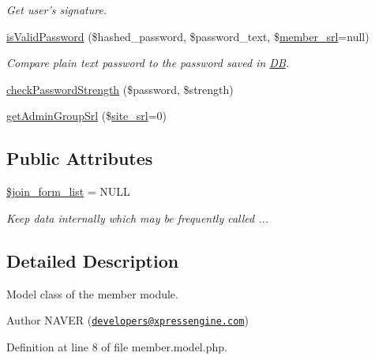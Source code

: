 \begin{DoxyCompactItemize}
\begin{DoxyCompactList}\small\item\em Get user's signature. \end{DoxyCompactList}\item 
\hyperlink{classmemberModel_a5d2727323d47e4304998311424bb4091}{is\+Valid\+Password} (\$hashed\+\_\+password, \$password\+\_\+text, \$\hyperlink{ko_8install_8php_aa61f9e08f0fe505094d26f8143f30bbd}{member\+\_\+srl}=null)
\begin{DoxyCompactList}\small\item\em Compare plain text password to the password saved in \hyperlink{classDB}{D\+B}. \end{DoxyCompactList}\item 
\hyperlink{classmemberModel_a5970b2dcba76f9fc910cc3df7de19ac7}{check\+Password\+Strength} (\$password, \$strength)
\item 
\hyperlink{classmemberModel_ad8c1aafe9a4f461404b596ff6ad3e2ed}{get\+Admin\+Group\+Srl} (\$\hyperlink{ko_8install_8php_a8b1406b4ad1048041558dce6bfe89004}{site\+\_\+srl}=0)
\end{DoxyCompactItemize}
\subsection*{Public Attributes}
\begin{DoxyCompactItemize}
\item 
\hyperlink{classmemberModel_aa9b942e17ed74955c8700dd74d75d2b2}{\$join\+\_\+form\+\_\+list} = N\+U\+L\+L
\begin{DoxyCompactList}\small\item\em Keep data internally which may be frequently called ... \end{DoxyCompactList}\end{DoxyCompactItemize}


\subsection{Detailed Description}
Model class of the member module. 

\begin{DoxyAuthor}{Author}
N\+A\+V\+E\+R (\href{mailto:developers@xpressengine.com}{\tt developers@xpressengine.\+com}) 
\end{DoxyAuthor}


Definition at line 8 of file member.\+model.\+php.



